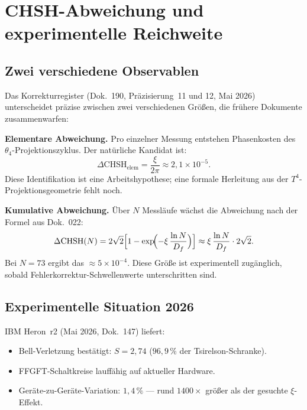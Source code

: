 \chapter{CHSH-Abweichung und experimentelle Reichweite}
\label{ch:chsh_exp}

\section{Zwei verschiedene Observablen}

Das Korrekturregister (Dok.~190, Präzisierung~11 und 12, Mai 2026)
unterscheidet präzise zwischen zwei verschiedenen Größen, die frühere
Dokumente zusammenwarfen:

\textbf{Elementare Abweichung.} Pro einzelner Messung entstehen
Phasenkosten des $\theta_4$-Projektionszyklus. Der natürliche
Kandidat ist:
\begin{equation}
  \Delta\mathrm{CHSH}_{\mathrm{elem}} = \frac{\xi}{2\pi}
  \approx 2{,}1\times10^{-5}.
\end{equation}
Diese Identifikation ist eine Arbeitshypothese; eine formale Herleitung
aus der $T^4$-Projektionsgeometrie fehlt noch.

\textbf{Kumulative Abweichung.} Über $N$ Messläufe wächst die
Abweichung nach der Formel aus Dok.~022:
\begin{equation}
  \Delta\mathrm{CHSH}(N) = 2\sqrt2 \Bigl[1 - \exp\!\Bigl(-\xi\,\frac{\ln N}{D_f}\Bigr)\Bigr]
  \approx \xi\,\frac{\ln N}{D_f}\cdot2\sqrt2.
\end{equation}
Bei $N=73$ ergibt das $\approx5\times10^{-4}$. Diese Größe ist
experimentell zugänglich, sobald Fehlerkorrektur-Schwellenwerte
unterschritten sind.

\section{Experimentelle Situation 2026}

IBM Heron~r2 (Mai 2026, Dok.~147) liefert:
\begin{itemize}
  \item Bell-Verletzung bestätigt: $S=2{,}74$ ($96{,}9\,\%$ der
        Tsirelson-Schranke).
  \item FFGFT-Schaltkreise lauffähig auf aktueller Hardware.
  \item Geräte-zu-Geräte-Variation: $1{,}4\,\%$ — rund
        $1400\times$ größer als der gesuchte $\xi$-Effekt.
\end{itemize}

